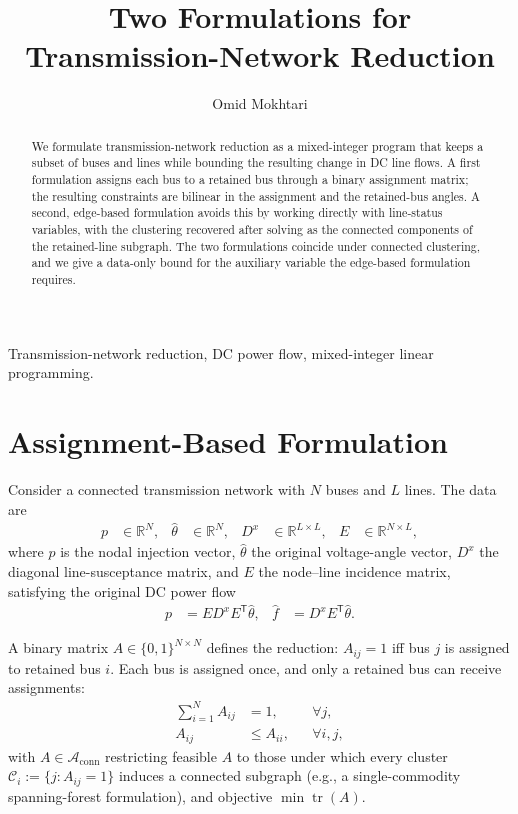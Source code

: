 \documentclass[journal]{IEEEtran}
\title{Two Formulations for Transmission-Network Reduction}
\author{Omid Mokhtari}
\newcommand{\R}{\mathbb{R}}
\newcommand{\tr}{\operatorname{tr}}
\begin{document}
\maketitle

\begin{abstract}
We formulate transmission-network reduction as a mixed-integer program that keeps a subset of buses and lines while bounding the resulting change in DC line flows. A first formulation assigns each bus to a retained bus through a binary assignment matrix; the resulting constraints are bilinear in the assignment and the retained-bus angles. A second, edge-based formulation avoids this by working directly with line-status variables, with the clustering recovered after solving as the connected components of the retained-line subgraph. The two formulations coincide under connected clustering, and we give a data-only bound for the auxiliary variable the edge-based formulation requires.
\end{abstract}

\begin{IEEEkeywords}
Transmission-network reduction, DC power flow, mixed-integer linear programming.
\end{IEEEkeywords}

\section{Assignment-Based Formulation}

Consider a connected transmission network with $N$ buses and $L$ lines. The data are
\begin{align}
 p&\in\R^N, &
 \hat\theta&\in\R^N, &
 D^x&\in\R^{L\times L}, &
 E&\in\R^{N\times L},
\end{align}
where $p$ is the nodal injection vector, $\hat\theta$ the original voltage-angle vector, $D^x$ the diagonal line-susceptance matrix, and $E$ the node--line incidence matrix, satisfying the original DC power flow
\begin{align}
 p&=ED^xE^{\mathsf T}\hat\theta, &
 \hat f&=D^xE^{\mathsf T}\hat\theta.
 \label{eq:original_flows}
\end{align}

A binary matrix $A\in\{0,1\}^{N\times N}$ defines the reduction: $A_{ij}=1$ iff bus $j$ is assigned to retained bus $i$. Each bus is assigned once, and only a retained bus can receive assignments:
\begin{align}
 \sum_{i=1}^{N}A_{ij}&=1, &&\forall j,
 \label{eq:assign_once}\\
 A_{ij}&\le A_{ii}, &&\forall i,j,
 \label{eq:only_retained}
\end{align}
with $A\in\mathcal A_{\mathrm{conn}}$ restricting feasible $A$ to those under which every cluster $\mathcal C_i:=\{j:A_{ij}=1\}$ induces a connected subgraph (e.g., a single-commodity spanning-forest formulation), and objective $\min\tr(A)$.
\end{document}
